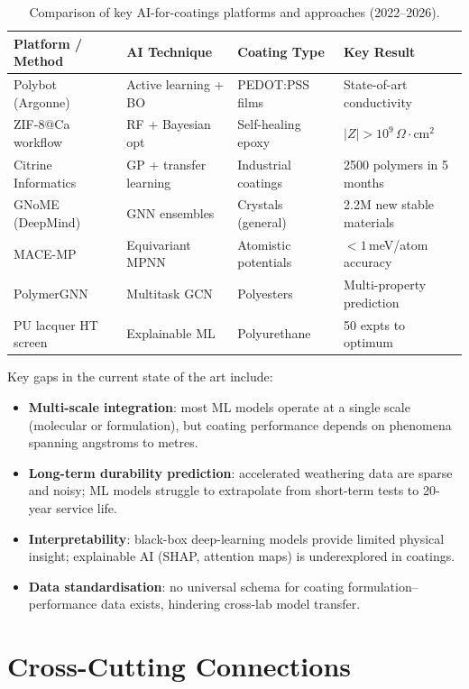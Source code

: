 \documentclass[11pt,a4paper]{article}
\begin{document}
\begin{table}[h]
\centering
\caption{Comparison of key AI-for-coatings platforms and approaches (2022--2026).}
\label{tab:comparison}
\small
\begin{tabular}{@{}llll@{}}
\toprule
\textbf{Platform / Method} & \textbf{AI Technique} & \textbf{Coating Type} & \textbf{Key Result} \\
\midrule
Polybot (Argonne) & Active learning + BO & PEDOT:PSS films & State-of-art conductivity \\
ZIF-8@Ca workflow & RF + Bayesian opt & Self-healing epoxy & $|Z| > 10^9\,\Omega\cdot$cm$^2$ \\
Citrine Informatics & GP + transfer learning & Industrial coatings & 2500 polymers in 5 months \\
GNoME (DeepMind) & GNN ensembles & Crystals (general) & 2.2M new stable materials \\
MACE-MP & Equivariant MPNN & Atomistic potentials & $<1$\,meV/atom accuracy \\
PolymerGNN & Multitask GCN & Polyesters & Multi-property prediction \\
PU lacquer HT screen & Explainable ML & Polyurethane & 50 expts to optimum \\
\bottomrule
\end{tabular}
\end{table}

Key gaps in the current state of the art include:
\begin{itemize}[nosep]
  \item \textbf{Multi-scale integration}: most ML models operate at a single scale (molecular or formulation), but coating performance depends on phenomena spanning angstroms to metres.
  \item \textbf{Long-term durability prediction}: accelerated weathering data are sparse and noisy; ML models struggle to extrapolate from short-term tests to 20-year service life.
  \item \textbf{Interpretability}: black-box deep-learning models provide limited physical insight; explainable AI (SHAP, attention maps) is underexplored in coatings.
  \item \textbf{Data standardisation}: no universal schema for coating formulation--performance data exists, hindering cross-lab model transfer.
\end{itemize}

\section{Cross-Cutting Connections}
\label{sec:crosscut}
\end{document}
